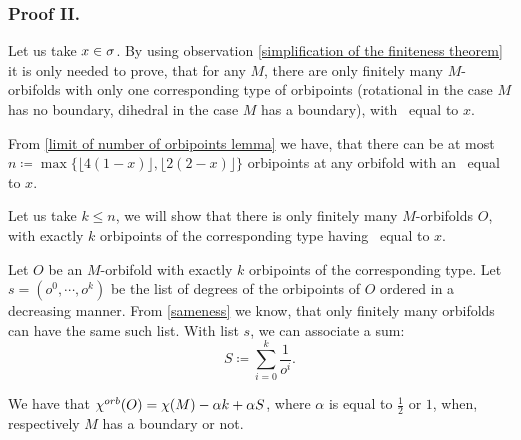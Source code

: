 \subsubsection{Proof II.}

Let us take $x\in {\sigma}$. 
By using observation \ref{simplification of the finiteness theorem} it is only needed to prove, 
that for any $M$, there are only finitely many $M$-orbifolds with only one corresponding 
type of orbipoints 
(rotational in the case $M$ has no boundary, dihedral in the case $M$ has a boundary),
with \Eoc\ equal to $x$. 

From \ref{limit of number of orbipoints lemma} 
we have, that there can be at most 
$n \coloneqq \max \{\lfloor 4(1-x) \rfloor, \lfloor 2(2-x) \rfloor\}$ 
orbipoints at any orbifold with an \Eoc\ equal to $x$. 

Let us take $k\leq n$, we will show that there is only finitely many $M$-orbifolds $O$,
with exactly $k$ orbipoints of the corresponding type having \Eoc\ equal to $x$. 

Let $O$ be an $M$-orbifold with exactly $k$ orbipoints of the corresponding type. Let 
$s = (o^0, \cdots, o^{k})$ be the list of degrees of 
the orbipoints  
of $O$ ordered in a decreasing manner. From \ref{sameness} we know, that only finitely 
many orbifolds can have the same such list.  
With list $s$, we can associate a sum:
\begin{equation} 
S \coloneqq \sum_{i=0}^k \frac{1}{o^i}.
\end{equation} 

We have that ${\chi^{orb}(O)} = \chi(M) - \alpha k + \alpha S$, where $\alpha$ is 
equal to $\frac{1}{2}$ or $1$, when, respectively $M$ has a boundary or not. 

